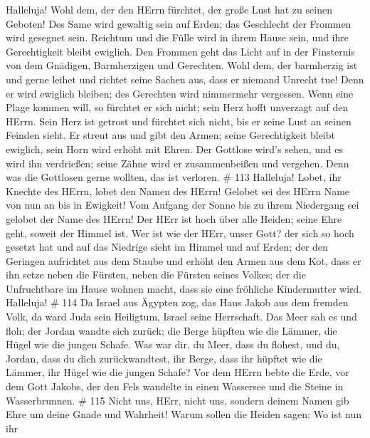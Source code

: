 Halleluja! Wohl dem, der den HErrn fürchtet, der große Lust hat zu
seinen Geboten!  Des Same wird gewaltig sein auf Erden; das
Geschlecht der Frommen wird gesegnet sein.  Reichtum und die
Fülle wird in ihrem Hause sein, und ihre Gerechtigkeit bleibt ewiglich.
 Den Frommen geht das Licht auf in der Finsternis von dem
Gnädigen, Barmherzigen und Gerechten.  Wohl dem, der
barmherzig ist und gerne leihet und richtet seine Sachen aus, dass er
niemand Unrecht tue!  Denn er wird ewiglich bleiben; des
Gerechten wird nimmermehr vergessen.  Wenn eine Plage kommen
will, so fürchtet er sich nicht; sein Herz hofft unverzagt auf den
HErrn.  Sein Herz ist getrost und fürchtet sich nicht, bis
er seine Lust an seinen Feinden sieht.  Er streut aus und
gibt den Armen; seine Gerechtigkeit bleibt ewiglich, sein Horn wird
erhöht mit Ehren.  Der Gottlose wird's sehen, und es wird
ihn verdrießen; seine Zähne wird er zusammenbeißen und vergehen. Denn
was die Gottlosen gerne wollten, das ist verloren. \# 113 
Halleluja! Lobet, ihr Knechte des HErrn, lobet den Namen des HErrn!
 Gelobet sei des HErrn Name von nun an bis in Ewigkeit!
 Vom Aufgang der Sonne bis zu ihrem Niedergang sei gelobet
der Name des HErrn!  Der HErr ist hoch über alle Heiden;
seine Ehre geht, soweit der Himmel ist.  Wer ist wie der
HErr, unser Gott? der sich so hoch gesetzt hat  und auf das
Niedrige sieht im Himmel und auf Erden;  der den Geringen
aufrichtet aus dem Staube und erhöht den Armen aus dem Kot, 
dass er ihn setze neben die Fürsten, neben die Fürsten seines Volkes;
 der die Unfruchtbare im Hause wohnen macht, dass sie eine
fröhliche Kindermutter wird. Halleluja! \# 114  Da Israel
aus Ägypten zog, das Haus Jakob aus dem fremden Volk,  da
ward Juda sein Heiligtum, Israel seine Herrschaft.  Das Meer
sah es und floh; der Jordan wandte sich zurück;  die Berge
hüpften wie die Lämmer, die Hügel wie die jungen Schafe. 
Was war dir, du Meer, dass du flohest, und du, Jordan, dass du dich
zurückwandtest,  ihr Berge, dass ihr hüpftet wie die Lämmer,
ihr Hügel wie die jungen Schafe?  Vor dem HErrn bebte die
Erde, vor dem Gott Jakobs,  der den Fels wandelte in einen
Wassersee und die Steine in Wasserbrunnen. \# 115  Nicht
uns, HErr, nicht uns, sondern deinem Namen gib Ehre um deine Gnade und
Wahrheit!  Warum sollen die Heiden sagen: Wo ist nun ihr
